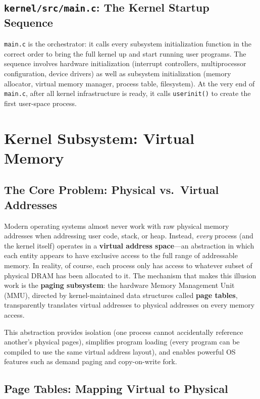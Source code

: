 \documentclass[11pt]{article}
\begin{document}
\subsection{\texttt{kernel/src/main.c}: The Kernel Startup Sequence}

\texttt{main.c} is the orchestrator: it calls every subsystem initialization function in the correct order to bring the full kernel up and start running user programs. The sequence involves hardware initialization (interrupt controllers, multiprocessor configuration, device drivers) as well as subsystem initialization (memory allocator, virtual memory manager, process table, filesystem). At the very end of \texttt{main.c}, after all kernel infrastructure is ready, it calls \texttt{userinit()} to create the first user-space process.

\section{Kernel Subsystem: Virtual Memory}

\subsection{The Core Problem: Physical vs.\ Virtual Addresses}

Modern operating systems almost never work with raw physical memory addresses when addressing user code, stack, or heap. Instead, \emph{every} process (and the kernel itself) operates in a \textbf{virtual address space}---an abstraction in which each entity appears to have exclusive access to the full range of addressable memory. In reality, of course, each process only has access to whatever subset of physical DRAM has been allocated to it. The mechanism that makes this illusion work is the \textbf{paging subsystem}: the hardware Memory Management Unit (MMU), directed by kernel-maintained data structures called \textbf{page tables}, transparently translates virtual addresses to physical addresses on every memory access.

This abstraction provides isolation (one process cannot accidentally reference another's physical pages), simplifies program loading (every program can be compiled to use the same virtual address layout), and enables powerful OS features such as demand paging and copy-on-write fork.

\subsection{Page Tables: Mapping Virtual to Physical}
\end{document}
